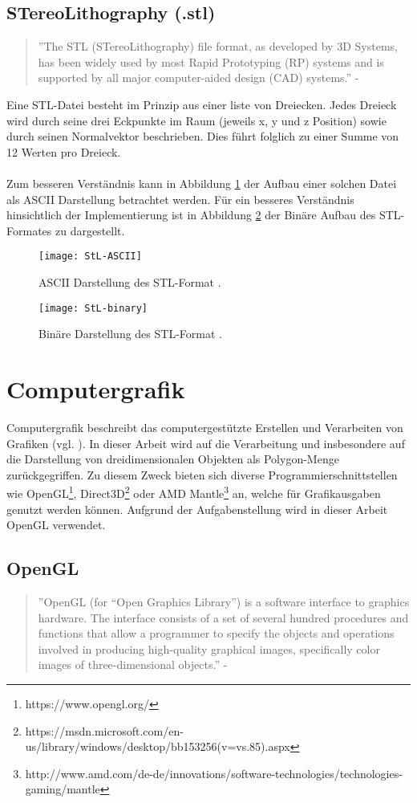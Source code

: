 \subsection{STereoLithography (.stl)}
\begin{quote}
	''The STL (STereoLithography) file format, as developed by 3D Systems, has been widely used by most Rapid Prototyping (RP) systems and is supported by all major computer-aided design (CAD) systems.'' - \cite{STereoLithography}
\end{quote}
Eine STL-Datei besteht im Prinzip aus einer liste von Dreiecken. Jedes Dreieck wird durch seine drei Eckpunkte im Raum (jeweils x, y und z Position) sowie durch seinen Normalvektor beschrieben. Dies führt folglich zu einer Summe von 12 Werten pro Dreieck.\\
\\
Zum besseren Verständnis kann in Abbildung \ref{fig:ASCIISTL} der Aufbau einer solchen Datei als ASCII Darstellung betrachtet werden. Für ein besseres Verständnis hinsichtlich der Implementierung ist in Abbildung \ref{fig:BINARYSTL} der Binäre Aufbau des STL-Formates zu dargestellt. 

\begin{figure}
	\centering
	\texttt{[image: StL-ASCII]}
	\caption{ASCII Darstellung des STL-Format \cite{STLFormat}.}
	\label{fig:ASCIISTL}
\end{figure}

\begin{figure}
	\centering
	\texttt{[image: StL-binary]}
	\caption{Binäre Darstellung des STL-Format \cite{STLFormat}.}
	\label{fig:BINARYSTL}
\end{figure}

\section{Computergrafik}
Computergrafik beschreibt das computergestützte Erstellen und Verarbeiten von Grafiken (vgl. \cite{ComputerGraphics}). In dieser Arbeit wird auf die Verarbeitung und insbesondere auf die Darstellung von dreidimensionalen Objekten als Polygon-Menge zurückgegriffen. Zu diesem Zweck bieten sich diverse Programmierschnittstellen wie OpenGL\footnote{https://www.opengl.org/}, Direct3D\footnote{https://msdn.microsoft.com/en-us/library/windows/desktop/bb153256(v=vs.85).aspx} oder AMD Mantle\footnote{http://www.amd.com/de-de/innovations/software-technologies/technologies-gaming/mantle} an, welche für Grafikausgaben genutzt werden können. Aufgrund der Aufgabenstellung wird in dieser Arbeit OpenGL verwendet.
\subsection{OpenGL}
\begin{quote}
	''OpenGL (for “Open Graphics Library”) is a software interface to graphics hardware.
	The interface consists of a set of several hundred procedures and functions
	that allow a programmer to specify the objects and operations involved in producing
	high-quality graphical images, specifically color images of three-dimensional
	objects.'' - \cite{OpenGLDoku}
\end{quote}
